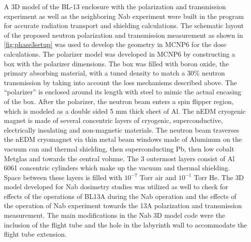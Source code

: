 A 3D model of the BL-13 enclosure with the polarization and transmission experiment as well as the neighboring Nab experiment were built in the program for accurate radiation transport and shielding calculations. The schematic layout of the proposed neutron polarization and transmission measurement as shown in \cref{fig:phase3setup} was used to develop the geometry in MCNP6 for the dose calculations. The polarizer model was developed in MCNP6 by constructing a box with the polarizer dimensions. The box was filled with boron oxide, the primary absorbing material, with a tuned density to match a 30\% neutron transmission by taking into account the loss mechanisms described above. The “polarizer” is enclosed around its length with steel to mimic the actual encasing of the box. After the polarizer, the neutron beam enters a spin flipper region, which is modeled as a double sided 5 mm thick sheet of Al. The nEDM cryogenic magnet is made of several concentric layers of cryogenic, superconductive, electrically insulating and non-magnetic materials. The neutron beam traverses the nEDM cryomagnet via thin metal beam windows made of Aluminum on the vacuum can and thermal shielding, then superconducting Pb, then low cobalt Metglas and towards the central volume. The 3 outermost layers consist of Al 6061 concentric cylinders which make up the vacuum and thermal shielding. Space between these layers is filled with $10^{-7}$ Torr air and $10^{-1}$ Torr He. The 3D model developed for Nab dosimetry studies was utilized as well to check for effects of the operations of BL13A during the Nab operation and the effects of the operation of Nab experiment towards the 13A polarization and transmission measurement. The main modifications in the Nab 3D model code were the inclusion of the flight tube and the hole in the labyrinth wall to accommodate the flight tube extension.


